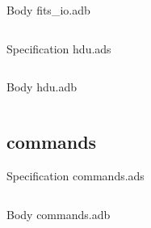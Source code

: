 \documentclass[a4paper,10pt]{article}
\begin{document}
Body fits\_io.adb
\inputminted{ada}{../fits_io.adb}

Specification hdu.ads
\inputminted{ada}{../hdu.ads}

Body hdu.adb
\inputminted{ada}{../hdu.adb}


\subsection{commands}

Specification commands.ads
\inputminted{ada}{../commands.ads}

Body commands.adb
\inputminted{ada}{../commands.adb}


\end{document}
